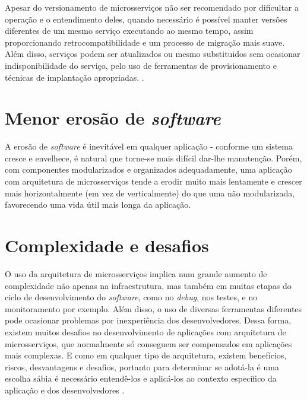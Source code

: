 Apesar do versionamento de microsserviços não ser recomendado por dificultar a operação e o entendimento deles, quando necessário é possível manter versões diferentes de um mesmo serviço executando ao mesmo tempo, assim proporcionando retrocompatibilidade e um processo de migração mais suave. Além disso, serviços podem ser atualizados ou mesmo substituidos sem ocasionar indisponibilidade do serviço, pelo uso de ferramentas de provisionamento e técnicas de implantação apropriadas. \cite{Familiar2015}.

\section{Menor erosão de \emph{software}}

A erosão de \emph{software} é inevitável em qualquer aplicação - conforme um sistema cresce e envelhece, é natural que torne-se mais difícil dar-lhe manutenção. Porém, com componentes modularizados e organizados adequadamente, uma aplicação com arquitetura de microsserviços tende a erodir muito mais lentamente e crescer mais horizontalmente (em vez de verticalmente) do que uma não modularizada, favorecendo uma vida útil mais longa da aplicação.



\section{Complexidade e desafios}

O uso da arquitetura de microsserviços implica num grande aumento de complexidade não apenas na infraestrutura, mas também em muitas etapas do ciclo de desenvolvimento do \emph{software}, como no \emph{debug}, nos testes, e no monitoramento por exemplo. Além disso, o uso de diversas ferramentas diferentes pode ocasionar problemas por inexperiência dos desenvolvedores. Dessa forma, existem muitos desafios no desenvolvimento de aplicações com arquitetura de microsserviços, que normalmente só conseguem ser compensados em aplicações mais complexas. E como em qualquer tipo de arquitetura, existem benefícios, riscos, desvantagens e desafios, portanto para determinar se adotá-la é uma escolha sábia é necessário entendê-los e aplicá-los ao contexto específico da aplicação e dos desenvolvedores \cite{top10-microservices-challenges,martin-fowler-microservice-tradeoffs}.

